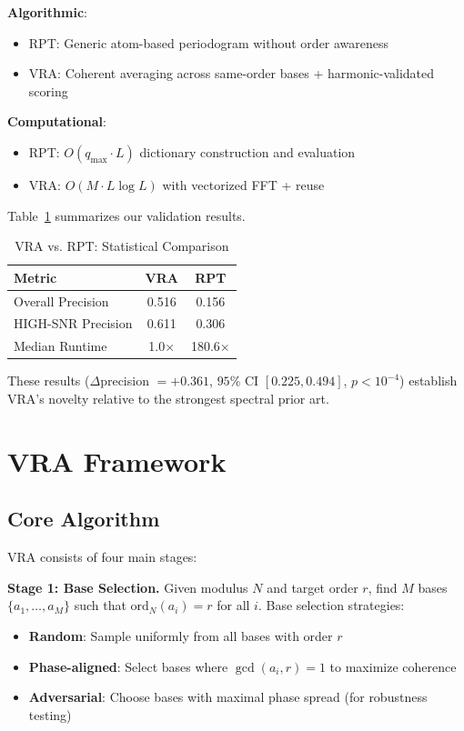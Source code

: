 \documentclass[conference]{IEEEtran}
\begin{document}
\textbf{Algorithmic}:
\begin{itemize}
    \item RPT: Generic atom-based periodogram without order awareness
    \item VRA: Coherent averaging across same-order bases + harmonic-validated scoring
\end{itemize}

\textbf{Computational}:
\begin{itemize}
    \item RPT: $O(q_{\max} \cdot L)$ dictionary construction and evaluation
    \item VRA: $O(M \cdot L \log L)$ with vectorized FFT + reuse
\end{itemize}

Table~\ref{tab:vra_vs_rpt} summarizes our validation results.

\begin{table}[h]
\centering
\caption{VRA vs. RPT: Statistical Comparison}
\label{tab:vra_vs_rpt}
\begin{tabular}{lcc}
\toprule
\textbf{Metric} & \textbf{VRA} & \textbf{RPT} \\
\midrule
Overall Precision & 0.516 & 0.156 \\
HIGH-SNR Precision & 0.611 & 0.306 \\
Median Runtime & 1.0$\times$ & 180.6$\times$ \\
\bottomrule
\end{tabular}
\end{table}

These results ($\Delta$precision $= +0.361$, $95\%$ CI $[0.225, 0.494]$, $p < 10^{-4}$) establish VRA's novelty relative to the strongest spectral prior art.


\section{VRA Framework}

\subsection{Core Algorithm}

VRA consists of four main stages:

\textbf{Stage 1: Base Selection.} Given modulus $N$ and target order $r$, find $M$ bases $\{a_1, \ldots, a_M\}$ such that $\text{ord}_N(a_i) = r$ for all $i$. Base selection strategies:
\begin{itemize}
    \item \textbf{Random}: Sample uniformly from all bases with order $r$
    \item \textbf{Phase-aligned}: Select bases where $\gcd(a_i, r) = 1$ to maximize coherence
    \item \textbf{Adversarial}: Choose bases with maximal phase spread (for robustness testing)
\end{itemize}
\end{document}
